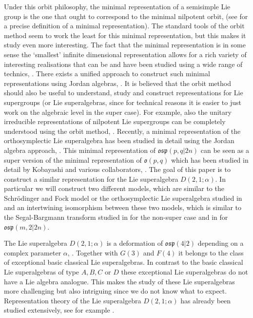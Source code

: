 \documentclass{amsart}
\numberwithin{theorem}{section}
\theoremstyle{definition}
\theoremstyle{remark}
\begin{document}
Under this orbit philosophy, the minimal representation of a semisimple Lie group is the one that ought to correspond to the minimal nilpotent orbit, (see \cite{GanSavin} for a precise definition of a minimal representation). The standard tools of the orbit method seem to work the least for this minimal representation, but this makes it study even more interesting. The fact that the minimal representation	 is in some sense the `smallest' infinite dimensional representation allows for a rich variety of interesting realisations that can be and have been studied using a wide range of technics, \cite{VergneRossi, DvorskySahi, KM, KO1, KO2, KO3}. There exists a unified approach to construct such minimal representations using Jordan algebras, \cite{HKMM, HKMO}. 
It is believed that the orbit method should also be useful to understand, study and construct representations for Lie supergroups (or Lie superalgebras, since for technical reasons it is easier to just work on the algebraic level in the super case). For example, also the unitary irreducible representations of nilpotent Lie supergroups can be completely understood using the orbit method, \cite{Salmasian, NeebSalmasian}. Recently, a minimal representation of the orthosymplectic Lie superalgebra has been studied in detail using the Jordan algebra approach, \cite{BC1, BF, BCD}. This minimal representation of $\mathfrak{osp}(p,q|2n)$ can be seen as a super version of the minimal representation of $\mathfrak{o}(p,q)$ which has been studied in detail by Kobayashi and various collaborators, \cite{KO1,KO2,KO3,KM} . 
The goal of this paper is to construct a similar representation for the Lie superalgebra $D(2,1;\alpha)$. In particular we will construct two different models, which are similar to the Schrödinger and Fock model or the orthosymplectic Lie superalgebra studied in \cite{BF, BCD}  and an intertwining isomorphism between these two models, which is similar to the Segal-Bargmann transform studied in \cite{HKMO} for the non-super case and in \cite{BCD} for $\mathfrak{osp}(m,2|2n)$. 

The Lie superalgebra $D(2,1;\alpha)$ is a deformation of $\mathfrak{osp}(4|2)$ depending on a complex parameter $\alpha$, \cite{K, Scheunert}. Together with $G(3)$ and $F(4)$ it belongs to the class of exceptional basic classical Lie superalgebras. In contrast to the basic classical Lie superalgebras of type $A,B,C$ or $D$ these exceptional Lie superalgebras do not have a Lie algebra analogue. This makes the study of these Lie superalgebras more challenging but also intriguing since we do not know what to expect.
Representation theory of the Lie superalgebra $D(2,1;\alpha)$ has already been studied extensively, see for example \cite{Jo, ChengWang, ChenChengLuo}.
\end{document}

